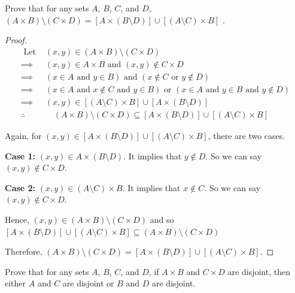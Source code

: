 \documentclass[12pt]{article}
\newenvironment{exercise}[2][Exercise]{\begin{trivlist}
\item[\hskip \labelsep {\bfseries #1}\hskip \labelsep {\bfseries #2.}]}{\end{trivlist}}
\newcommand{\ro}{\text { or }}
\newcommand{\nd}{\text{ and }}
\begin{document}
\begin{exercise}
	{11}
	Prove that for any sets \( A \), \( B \), \( C \), and \( D \), \( (A \times B) \setminus (C \times D) = [A \times (B \setminus D)] \cup [(A \setminus C)\times B] \) .
\end{exercise}

\begin{proof}
	\begin{align*}
		\text{ Let } & (x,y)\in (A \times B) \setminus (C \times D)                                                          \\
		\implies     & (x,y)\in A\times B \nd (x,y)\notin C\times D                                                          \\
		\implies     & (x\in A \nd y\in B) \nd (x\notin C \ro y\notin D)                                                     \\
		\implies     & (x\in A \nd x\notin C \nd y\in B) \ro (x\in A \nd y\in B \nd y\notin D)                               \\
		\implies     & (x,y)\in [(A\setminus C)\times B]\cup [A\times (B\setminus D)]                                        \\
		\therefore   & \quad (A\times B)\setminus (C\times D)\subseteq [A\times (B\setminus D)]\cup [(A\setminus C)\times B]
	\end{align*}

	Again, for \( (x,y)\in [A\times (B\setminus D)]\cup [(A\setminus C)\times B] \), there are two cases.

	\textbf{Case 1:} \( (x,y)\in A\times (B\setminus D) \). It implies that \( y\notin D \). So we can say \( (x,y)\notin C\times D \).

	\textbf{Case 2:} \( (x,y)\in (A\setminus C)\times B \). It implies that \( x\notin C \). So we can say \( (x,y)\notin C\times D \).

	Hence, \( (x,y)\in (A\times B)\setminus (C\times D) \) and so \( [A\times (B\setminus D)]\cup [(A\setminus C)\times B]\subseteq (A\times B)\setminus (C\times D) \)

	Therefore, \( (A\times B)\setminus (C\times D)=[A\times (B\setminus D)]\cup [(A\setminus C)\times B] \).
\end{proof}

\begin{exercise}
	{12}
	Prove that for any sets \( A \), \( B \), \( C \), and \( D \), if \( A \times B \) and \( C \times D \) are disjoint, then either \( A \) and \( C \) are disjoint or \( B \) and \( D \) are disjoint.
\end{exercise}
\end{document}

